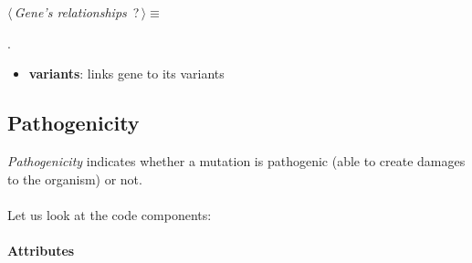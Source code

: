 	\begin{flushleft} \small
\begin{minipage}{\linewidth}\label{scrap7}\raggedright\small
{} $\langle\,${\itshape {Gene's relationships}}\nobreak\ {\footnotesize {?}}$\,\rangle\equiv$
\vspace{-1ex}
\begin{list}{}{} \item

                
        {\NWsep}
\end{list}
\vspace{-1.5ex}
\footnotesize
\begin{list}{}{\setlength{\itemsep}{-\parsep}\setlength{\itemindent}{-\leftmargin}}
\item {\NWtxtMacroNoRef}.

\item{}
\end{list}
\end{minipage}\vspace{4ex}
\end{flushleft}
\begin{itemize}
 	\item \textbf{variants}: links gene to its variants
\end{itemize}


\subsection{Pathogenicity}
\emph{Pathogenicity} indicates whether a mutation is pathogenic (able to create damages to the organism) or not.
\\
\\Let us look at the code components:

\paragraph{Attributes}      


